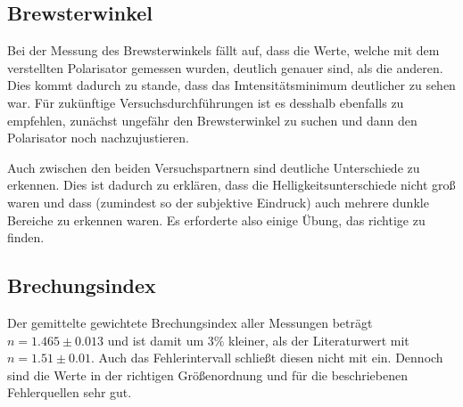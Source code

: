 \documentclass[12pt,a4paper,titlepage,headinclude,bibtotoc]{scrartcl}
\begin{document}
\subsection{Brewsterwinkel}
Bei der Messung des Brewsterwinkels fällt auf, dass die Werte, welche mit dem verstellten Polarisator gemessen wurden, deutlich genauer sind, als die anderen.
Dies kommt dadurch zu stande, dass das Imtensitätsminimum deutlicher zu sehen war.
Für zukünftige Versuchsdurchführungen ist es desshalb ebenfalls zu empfehlen, zunächst ungefähr den Brewsterwinkel zu suchen und dann den Polarisator noch nachzujustieren.

Auch zwischen den beiden Versuchspartnern sind deutliche Unterschiede zu erkennen.
Dies ist dadurch zu erklären, dass die Helligkeitsunterschiede nicht groß waren und dass (zumindest so der subjektive Eindruck) auch mehrere dunkle Bereiche zu erkennen waren.
Es erforderte also einige Übung, das richtige zu finden.


\subsection{Brechungsindex}
Der gemittelte gewichtete Brechungsindex aller Messungen beträgt $n = 1.465 \pm 0.013$ und ist damit um $3 \%$ kleiner, als der Literaturwert mit $n=1.51\pm 0.01$.
Auch das Fehlerintervall schließt diesen nicht mit ein.
Dennoch sind die Werte in der richtigen Größenordnung und für die beschriebenen Fehlerquellen sehr gut.



 
 
\end{document}
